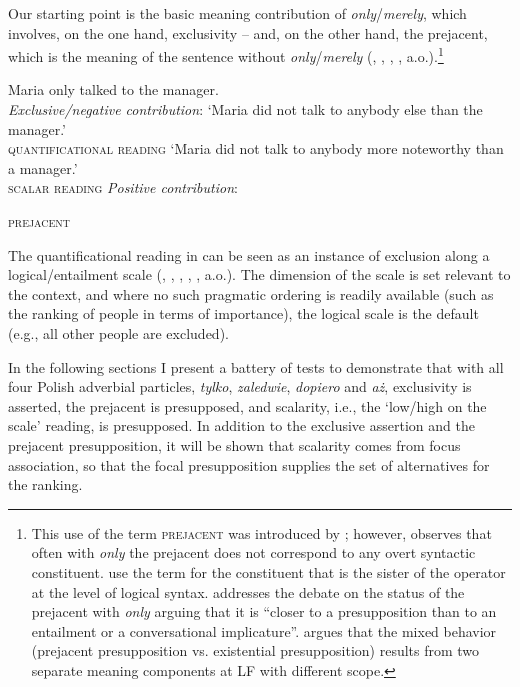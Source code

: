 \documentclass[output=paper,colorlinks,citecolor=brown]{langscibook}
\begin{document}
Our starting point is the basic meaning contribution of \textit{only}/\textit{merely}, which involves, on the one hand, exclusivity -- and, on the other hand, the prejacent, which is the meaning of the sentence without \textit{only}/\textit{merely}  (\citealt{klinedinst05}, \citealt{roberts06}, \citealt{vanrooijschulz07}, \citealt{beaverclark08}, a.o.).\footnote{This use of the term \textsc{prejacent} was introduced by \citet{horn96}; however, \citet{roberts06} observes that often with \textit{only} the prejacent does not correspond to any overt syntactic constituent. \citet{vonfintelheim02} use the term for the constituent that is the sister of the operator at the level of logical syntax. \citet{roberts06} addresses the debate on the status of the prejacent with \textit{only} arguing that it is “closer to a presupposition than to an entailment or a conversational implicature”. \citet{crnic12} argues that the mixed behavior (prejacent presupposition vs. existential presupposition) results from two separate meaning components at LF with different scope.}

\ea\label{ex:tom:16}
Maria only talked to the manager.\smallskip\\
\textit{Exclusive/negative contribution}:
\ea\label{ex:tom:16a}   
`Maria did not talk to anybody else than the manager.'\\\hfill \textsc{quantificational reading}
\ex\label{ex:tom:16b}  
`Maria did not talk to anybody more noteworthy than a manager.'\\\hfill \textsc{scalar reading}
\z
\textit{Positive contribution}:
\begin{xlist}
\hfill \textsc{prejacent}\label{ex:tom:16c}

\end{xlist} 
\z 

\noindent The quantificational reading in  can be seen as an instance of exclusion along a logical/entailment scale (\citealt{bonomicasalegno93}, \citealt{vanrooij02}, \citealt{beaver04}, \citealt{klinedinst05}, \citealt{riester06}, a.o.). The dimension of the scale is set relevant to the context, and where no such pragmatic ordering is readily available (such as the ranking of people in terms of importance), the logical scale is the default (e.g., all other people are excluded).

In the following sections I present a battery of tests to demonstrate that with all four Polish adverbial particles, \textit{tylko}, \textit{zaledwie}, \textit{dopiero} and \textit{aż}, exclusivity is asserted, the prejacent is presupposed, and scalarity, i.e., the `low/high on the scale' reading, is presupposed. In addition to the exclusive assertion and the prejacent presupposition, it will be shown that scalarity comes from focus association,  so that the focal presupposition supplies the set of alternatives for the ranking.
\end{document}
